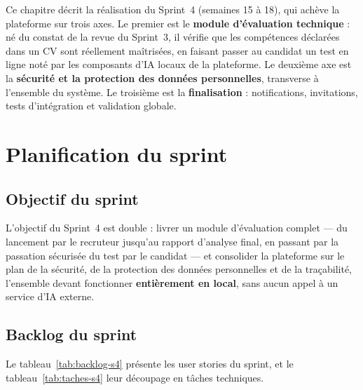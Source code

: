 \documentclass[12pt,a4paper]{report}
\begin{document}
Ce chapitre décrit la réalisation du Sprint~4 (semaines 15 à 18), qui achève la plateforme sur trois axes. Le premier est le \textbf{module d'évaluation technique} : né du constat de la revue du Sprint~3, il vérifie que les compétences déclarées dans un CV sont réellement maîtrisées, en faisant passer au candidat un test en ligne noté par les composants d'IA locaux de la plateforme. Le deuxième axe est la \textbf{sécurité et la protection des données personnelles}, transverse à l'ensemble du système. Le troisième est la \textbf{finalisation} : notifications, invitations, tests d'intégration et validation globale.

\section{Planification du sprint}

\subsection{Objectif du sprint}

L'objectif du Sprint~4 est double : livrer un module d'évaluation complet --- du lancement par le recruteur jusqu'au rapport d'analyse final, en passant par la passation sécurisée du test par le candidat --- et consolider la plateforme sur le plan de la sécurité, de la protection des données personnelles et de la traçabilité, l'ensemble devant fonctionner \textbf{entièrement en local}, sans aucun appel à un service d'IA externe.

\subsection{Backlog du sprint}

Le tableau~\ref{tab:backlog-s4} présente les user stories du sprint, et le tableau~\ref{tab:taches-s4} leur découpage en tâches techniques.
\end{document}
